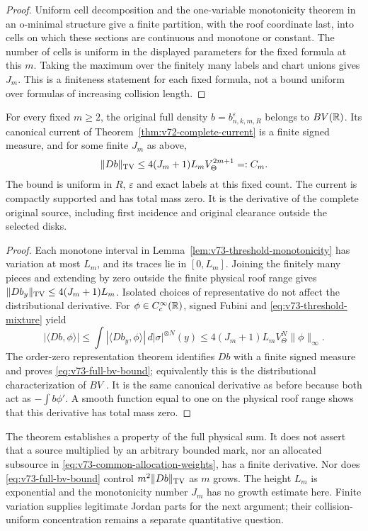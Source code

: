 \begin{proof}
Uniform cell decomposition and the one-variable monotonicity theorem
in an o-minimal structure \cite{Coste} give a finite partition, with
the roof coordinate last, into cells on which these sections are
continuous and monotone or constant. The number of cells is uniform
in the displayed parameters for the fixed formula at this $m$.
Taking the maximum over the finitely many labels and chart unions
gives $J_m$. This is a finiteness statement for each fixed formula,
not a bound uniform over formulas of increasing collision length.
\end{proof}

\begin{theorem}
\label{thm:v73-full-source-bv}
For every fixed $m\ge2$, the original full density
$b=b^\varepsilon_{n,k,m,R}$ belongs to $BV(\mathbb R)$. Its canonical
current of Theorem~\ref{thm:v72-complete-current} is a finite signed
measure, and for some finite $J_m$ as above,
\begin{equation}\label{eq:v73-full-bv-bound}
 \|Db\|_{\TV}\le 4(J_m+1)L_m V_\Theta^{2m+1}=:C_m.
\end{equation}
The bound is uniform in $R$, $\varepsilon$ and exact labels at this
fixed count. The current is compactly supported and has total mass
zero. It is the derivative of the complete original source, including
first incidence and original clearance outside the selected disks.
\end{theorem}
\begin{proof}
Each monotone interval in Lemma~\ref{lem:v73-threshold-monotonicity}
has variation at most $L_m$, and its traces lie in $[0,L_m]$.
Joining the finitely many pieces and extending by zero outside the
finite physical roof range gives
$\|Db_y\|_{\operatorname{TV}}\le4(J_m+1)L_m$. Isolated choices of representative
do not affect the distributional derivative. For
$\phi\in C_c^\infty(\mathbb R)$, signed Fubini and
\eqref{eq:v73-threshold-mixture} yield
\[
 |\langle Db,\phi\rangle|
 \le\int |\langle Db_y,\phi\rangle|\,d|\sigma|^{\otimes N}(y)
 \le4(J_m+1)L_m V_\Theta^N\|\phi\|_\infty.
\]
The order-zero representation theorem identifies $Db$ with a finite
signed measure and proves \eqref{eq:v73-full-bv-bound}; equivalently
this is the distributional characterization of $BV$ \cite{AFP}.
It is the same canonical derivative as before because both act as
$-\int b\phi'$. A smooth function equal to one on the physical roof
range shows that this derivative has total mass zero.
\end{proof}

The theorem establishes a property of the full physical sum. It does
not assert that a source multiplied by an arbitrary bounded mark,
nor an allocated subsource in \eqref{eq:v73-common-allocation-weights},
has a finite derivative. Nor does \eqref{eq:v73-full-bv-bound}
control $m^2\|Db\|_{\operatorname{TV}}$ as $m$ grows. The height $L_m$ is
exponential and the monotonicity number $J_m$ has no growth estimate
here. Finite variation supplies legitimate Jordan parts for the
next argument; their collision-uniform concentration remains a
separate quantitative question.
